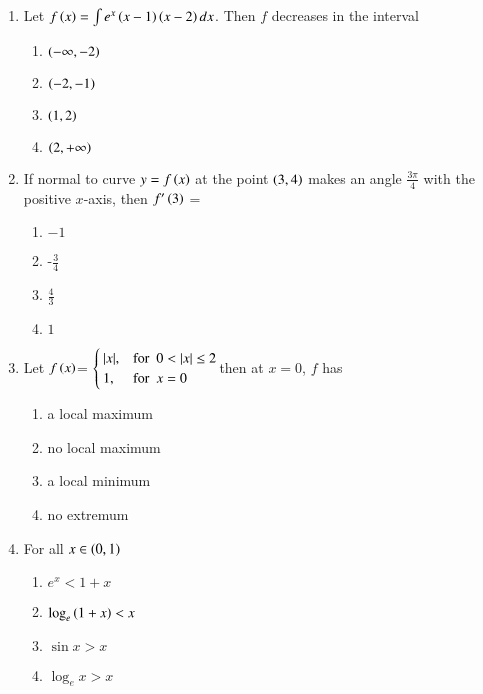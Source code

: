 \documentclass[journal]{IEEEtran}
\begin{document}
\begin{enumerate}[start=9]
\item Let $f\left(x\right)=\int e^x\left(x-1\right)\left(x-2\right)dx$. Then $f$ decreases in the interval 
\hfill {}
\begin{multicols}{4}
\begin{enumerate}
    \item $\left(-\infty,-2\right)$
    \item $\left(-2,-1\right)$
    \item $\left(1,2\right)$
    \item $\left(2,+\infty\right)$
\end{enumerate}
\end{multicols}
\item If normal to curve $y=f\left(x\right)$ at the point $\left(3,4\right)$ makes an angle $\frac{3\pi}{4}$ with the positive $x$-axis, then $f^{\prime}\left(3\right)$ = \hfill{}
\begin{multicols}{4}
\begin{enumerate}
    \item $-1$
    \item -$\frac{3}{4}$
    \item $\frac{4}{3}$
    \item $1$
\end{enumerate}
\end{multicols}
\item Let $f\left(x\right)$=
$\begin{cases}
|x|, & \text{for } \ 0< \left\vert x\right\vert \leq 2\\ 
1, & \text{for }\  x=0
\end{cases}$then at $x=0$, $f$ has
\hfill {}
\begin{multicols}{2}
\begin{enumerate}
    \item a local maximum
    \item no local maximum
    \item a local minimum
    \item no extremum
\end{enumerate}
\end{multicols}
\item For all $x\in\left(0,1\right)$
\hfill {}
\begin{multicols}{4}
\begin{enumerate}
    \item $e^{x} <1+x$
    \item $\log_e{\left(1+x\right)} < x$
    \item $ \sin{x} > x$
    \item $ \log_e{x} > x $

\end{enumerate}
\end{multicols}
\end{enumerate}
\end{document}
